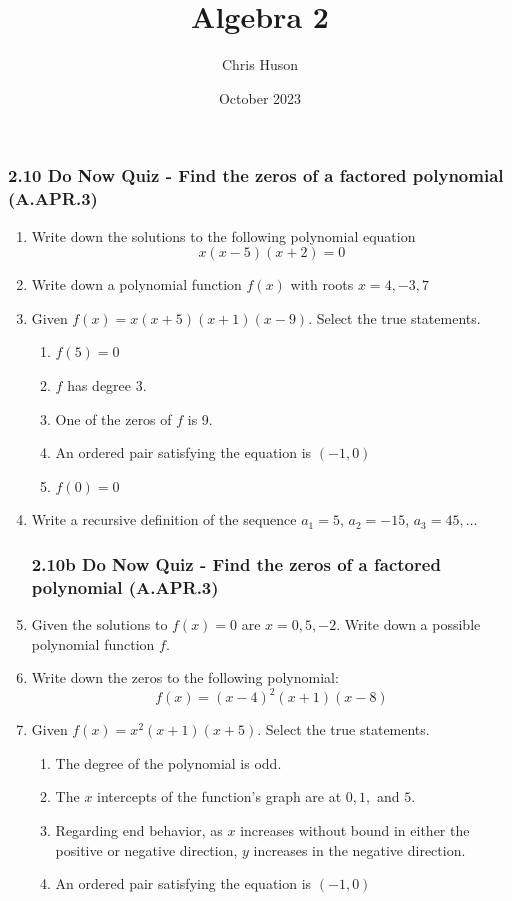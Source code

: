 \documentclass[12pt, twoside]{article}
\title{Algebra 2}
\author{Chris Huson}
\date{October 2023}
\begin{document}
\subsubsection*{2.10 Do Now Quiz - Find the zeros of a factored polynomial (A.APR.3)}
\begin{enumerate}[itemsep=1.5cm]
\item Write down the solutions to the following polynomial equation
\[x(x-5)(x+2)=0\]

\item Write down a polynomial function $f(x)$ with roots $x=4, -3, 7$

\item Given $f(x) = x(x+5)(x+1)(x-9)$. Select the true statements.
    \begin{enumerate}
    \item $f(5)=0$
    \item $f$ has degree 3.
    \item One of the zeros of $f$ is 9.
    \item An ordered pair satisfying the equation is $(-1,0)$
    \item $f(0)=0$
    \end{enumerate}

\item Write a recursive definition of the sequence $a_1 = 5$, $a_2 = -15$, $a_3 = 45, \ldots$

\newpage
\subsubsection*{2.10b Do Now Quiz - Find the zeros of a factored polynomial (A.APR.3)}
\vspace{-1.5cm}
\setcounter{enumi}{0}
\item Given the solutions to $f(x)=0$ are $x=0, 5, -2$. Write down a possible polynomial function $f$.

\item Write down the zeros to the following polynomial:
\[f(x) = (x-4)^2 (x+1)(x-8)\]

\item Given $f(x) = x^2(x+1)(x+5)$. Select the true statements.
    \begin{enumerate}
    \item The degree of the polynomial is odd.
    \item The $x$ intercepts of the function's graph are at $0, 1,$ and $5$.
    \item Regarding end behavior, as $x$ increases without bound in either the positive or negative direction, $y$ increases in the negative direction.
    \item An ordered pair satisfying the equation is $(-1,0)$
    \end{enumerate}


\end{enumerate}
\end{document}
